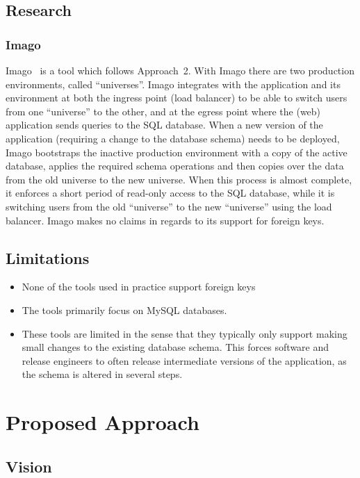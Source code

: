 \documentclass[conference]{IEEEtran}
\begin{document}
\subsection{Research}

\subsubsection{Imago}
Imago~\cite{Dumitras:2009:WUF:1656980.1657005} is a tool which follows Approach~2. With Imago there are two production environments, called ``universes''. Imago integrates with the application and its environment at both the ingress point (load balancer) to be able to switch users from one ``universe'' to the other, and at the egress point where the (web) application sends queries to the SQL database. When a new version of the application (requiring a change to the database schema) needs to be deployed, Imago bootstraps the inactive production environment with a copy of the active database, applies the required schema operations and then copies over the data from the old universe to the new universe. When this process is almost complete, it enforces a short period of read-only access to the SQL database, while it is switching users from the old ``universe'' to the new ``universe'' using the load balancer. Imago makes no claims in regards to its support for foreign keys.

\subsection{Limitations} 

\begin{itemize}
  \item None of the tools used in practice support foreign keys
  \item The tools primarily focus on MySQL databases.
  \item These tools are limited in the sense that they typically only support making small changes to the existing database schema. This forces software and release engineers to often release intermediate versions of the application, as the schema is altered in several steps.
\end{itemize}

\section{Proposed Approach} %

\subsection{Vision}
\end{document}
